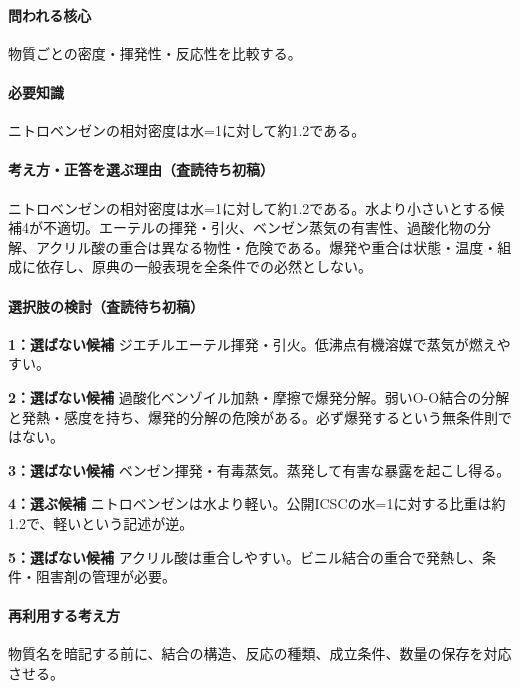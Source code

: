 \paragraph{問われる核心} 物質ごとの密度・揮発性・反応性を比較する。

\paragraph{必要知識} ニトロベンゼンの相対密度は水=1に対して約1.2である。

\paragraph{考え方・正答を選ぶ理由（査読待ち初稿）} ニトロベンゼンの相対密度は水=1に対して約1.2である。水より小さいとする候補4が不適切。エーテルの揮発・引火、ベンゼン蒸気の有害性、過酸化物の分解、アクリル酸の重合は異なる物性・危険である。爆発や重合は状態・温度・組成に依存し、原典の一般表現を全条件での必然としない。

\paragraph{選択肢の検討（査読待ち初稿）}\mbox{}\par

\noindent\textbf{1：選ばない候補} ジエチルエーテル揮発・引火。低沸点有機溶媒で蒸気が燃えやすい。\par

\noindent\textbf{2：選ばない候補} 過酸化ベンゾイル加熱・摩擦で爆発分解。弱いO-O結合の分解と発熱・感度を持ち、爆発的分解の危険がある。必ず爆発するという無条件則ではない。\par

\noindent\textbf{3：選ばない候補} ベンゼン揮発・有毒蒸気。蒸発して有害な暴露を起こし得る。\par

\noindent\textbf{4：選ぶ候補} ニトロベンゼンは水より軽い。公開ICSCの水=1に対する比重は約1.2で、軽いという記述が逆。\par

\noindent\textbf{5：選ばない候補} アクリル酸は重合しやすい。ビニル結合の重合で発熱し、条件・阻害剤の管理が必要。\par

\paragraph{再利用する考え方} 物質名を暗記する前に、結合の構造、反応の種類、成立条件、数量の保存を対応させる。

